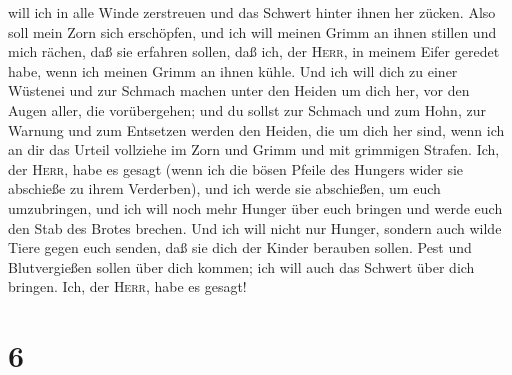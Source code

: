 will ich in alle Winde zerstreuen und das Schwert hinter ihnen her
zücken.  Also soll mein Zorn sich erschöpfen, und ich
will meinen Grimm an ihnen stillen und mich rächen, daß sie erfahren
sollen, daß ich, der \textsc{Herr}, in meinem Eifer geredet habe, wenn
ich meinen Grimm an ihnen kühle.  Und ich will dich zu
einer Wüstenei und zur Schmach machen unter den Heiden um dich her, vor
den Augen aller, die vorübergehen;  und du sollst zur
Schmach und zum Hohn, zur Warnung und zum Entsetzen werden den Heiden,
die um dich her sind, wenn ich an dir das Urteil vollziehe im Zorn und
Grimm und mit grimmigen Strafen.  Ich, der \textsc{Herr},
habe es gesagt (wenn ich die bösen Pfeile des Hungers wider sie
abschieße zu ihrem Verderben), und ich werde sie abschießen, um euch
umzubringen, und ich will noch mehr Hunger über euch bringen und werde
euch den Stab des Brotes brechen.  Und ich will nicht nur
Hunger, sondern auch wilde Tiere gegen euch senden, daß sie dich der
Kinder berauben sollen. Pest und Blutvergießen sollen über dich kommen;
ich will auch das Schwert über dich bringen. Ich, der \textsc{Herr},
habe es gesagt!

\hypertarget{section-5}{%
\section{6}\label{section-5}}

